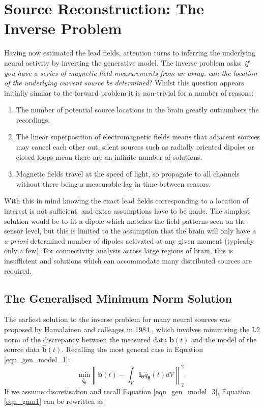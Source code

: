 \section{Source Reconstruction: The Inverse Problem}\label{sec_inverse_problem}
Having now estimated the lead fields, attention turns to inferring the underlying neural activity by inverting the generative model. The inverse problem asks: \textit{if you have a series of magnetic field measurements from an array, can the location of the underlying current source be determined}? Whilst this question appears initially similar to the forward problem it is non-trivial for a number of reasons:

\begin{enumerate}
	\item{The number of potential source locations in the brain greatly outnumbers the recordings.}
	\item{The linear superposition of electromagnetic fields means that adjacent sources may cancel each other out, silent sources such as radially oriented dipoles or closed loops mean there are an infinite number of solutions.}
	\item{Magnetic fields travel at the speed of light, so propagate to all channels without there being a measurable lag in time between sensors. }
\end{enumerate} With this in mind knowing the exact lead fields corresponding to a location of interest is not sufficient, and extra assumptions have to be made. The simplest solution would be to fit a dipole which matches the field patterns seen on the sensor level, but this is limited to the assumption that the brain will only have a \textit{a-priori} determined number of dipoles activated at any given moment (typically only a few). For connectivity analysis across large regions of brain, this is insufficient and solutions which can accommodate many distributed sources are required.  

\subsection{The Generalised Minimum Norm Solution}
The earliest solution to the inverse problem for many neural sources was proposed by Hamalainen and colleages in 1984 \citep{Hamalainen1994}, which involves minimising the L2 norm of the discrepancy between the measured data $\textbf{b}(t)$ and the model of the source data $\hat{\mathbf{b}}(t)$. Recalling the most general case in Equation \ref{eqn_gen_model_1}:
\begin{equation}
\underset{\hat{q}_\mathbf{\theta}}{\text{min}}\left\| \textbf{b}(t)-\int_V \mathbf{l}_\mathbf{\theta}\hat{q}_\mathbf{\theta}(t) dV\right\|^2_2.\label{eqn_gmn1}
\end{equation} If we assume discretisation and recall Equation \ref{eqn_gen_model_3}, Equation \ref{eqn_gmn1} can be rewritten as

